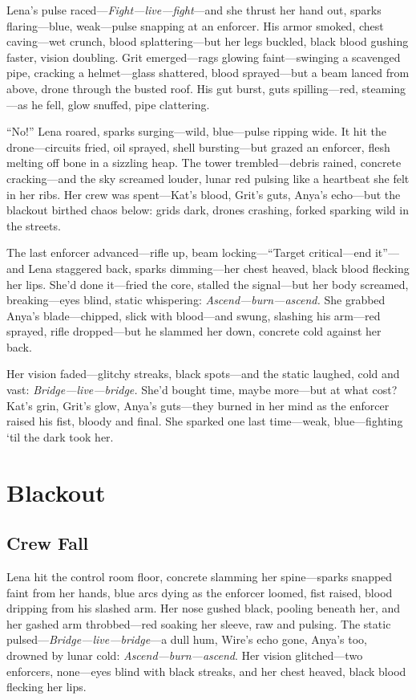 \documentclass[12pt]{book}
\begin{document}
Lena’s pulse raced—\emph{Fight---live---fight}—and she thrust her hand out, sparks flaring—blue, weak—pulse snapping at an enforcer. His armor smoked, chest caving—wet crunch, blood splattering—but her legs buckled, black blood gushing faster, vision doubling. Grit emerged—rags glowing faint—swinging a scavenged pipe, cracking a helmet—glass shattered, blood sprayed—but a beam lanced from above, drone through the busted roof. His gut burst, guts spilling—red, steaming—as he fell, glow snuffed, pipe clattering.

``No!'' Lena roared, sparks surging—wild, blue—pulse ripping wide. It hit the drone—circuits fried, oil sprayed, shell bursting—but grazed an enforcer, flesh melting off bone in a sizzling heap. The tower trembled—debris rained, concrete cracking—and the sky screamed louder, lunar red pulsing like a heartbeat she felt in her ribs. Her crew was spent—Kat’s blood, Grit’s guts, Anya’s echo—but the blackout birthed chaos below: grids dark, drones crashing, forked sparking wild in the streets.

The last enforcer advanced—rifle up, beam locking—``Target critical—end it''—and Lena staggered back, sparks dimming—her chest heaved, black blood flecking her lips. She’d done it—fried the core, stalled the signal—but her body screamed, breaking—eyes blind, static whispering: \emph{Ascend---burn---ascend.} She grabbed Anya’s blade—chipped, slick with blood—and swung, slashing his arm—red sprayed, rifle dropped—but he slammed her down, concrete cold against her back.

Her vision faded—glitchy streaks, black spots—and the static laughed, cold and vast: \emph{Bridge---live---bridge.} She’d bought time, maybe more—but at what cost? Kat’s grin, Grit’s glow, Anya’s guts—they burned in her mind as the enforcer raised his fist, bloody and final. She sparked one last time—weak, blue—fighting ‘til the dark took her.

\chapter{Blackout}
\section{Crew Fall}

Lena hit the control room floor, concrete slamming her spine---sparks snapped faint from her hands, blue arcs dying as the enforcer loomed, fist raised, blood dripping from his slashed arm. Her nose gushed black, pooling beneath her, and her gashed arm throbbed---red soaking her sleeve, raw and pulsing. The static pulsed---\emph{Bridge---live---bridge}---a dull hum, Wire’s echo gone, Anya’s too, drowned by lunar cold: \emph{Ascend---burn---ascend}. Her vision glitched---two enforcers, none---eyes blind with black streaks, and her chest heaved, black blood flecking her lips.
\end{document}
